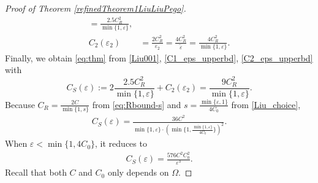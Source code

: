 \documentclass{article}
\theoremstyle{definition}                   %
\begin{document}
\begin{proof}[Proof of Theorem \ref{refinedTheorem1LiuLiuPego}]
\begin{align}
=\frac{2.5 C_R^2}{\min\{1,\varepsilon\}},
\label{C1_eps_upperbd}
\\
C_2(\varepsilon_2)&=\frac{2C_R^2}{\varepsilon_2}=\frac{4C_R^2}{\tilde\varepsilon}
=\frac{4C_R^2}{\min\{1,\varepsilon \}}.
\label{C2_eps_upperbd}
\end{align}
%
Finally, we obtain \eqref{eq:thm} from \eqref{Liu001}, \eqref{C1_eps_upperbd}, \eqref{C2_eps_upperbd} 
with  
\[
C_S(\varepsilon) := 2\frac{2.5 C_R^2}{\min\{1,\varepsilon \}}
 +C_2(\varepsilon_2) = \frac{9C_R^2}{\min\{1,\varepsilon \}}.
\]
Because $C_R= \frac{2C}{\min\{1,s \}}$ from \eqref{eq:Rbound-s} and $s=\frac{\min\{\varepsilon,1\}}{4C_0}$ from \eqref{Liu_choice}, 
\begin{align}
C_S(\varepsilon) = \frac{36 C^2}{\min\{1,\varepsilon \}  \cdot \left(\min\{1, \frac{\min\{1,\varepsilon \}}{4C_0} \} \right)^2 }.
\label{C_eps_arbi_eps}
\end{align}
When $\varepsilon<\min\{1, 4C_0\}$, it reduces to 
\begin{align}
C_S(\varepsilon)=\frac{576 C^2 C_0^2}{\varepsilon^3}.
\label{C_eps_small_eps}
\end{align}
Recall that both $C$ and $C_0$ only depends on $\Omega$. 

\end{proof}





\end{document}
